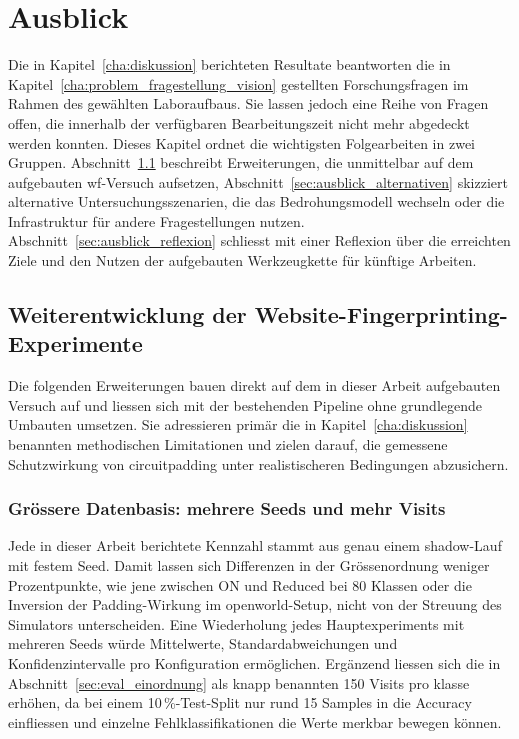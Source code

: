 \chapter{Ausblick}
\label{cha:ausblick}

Die in Kapitel~\ref{cha:diskussion} berichteten Resultate beantworten die in Kapitel~\ref{cha:problem_fragestellung_vision} gestellten Forschungsfragen im Rahmen des gewählten Laboraufbaus.
Sie lassen jedoch eine Reihe von Fragen offen, die innerhalb der verfügbaren Bearbeitungszeit nicht mehr abgedeckt werden konnten.
Dieses Kapitel ordnet die wichtigsten Folgearbeiten in zwei Gruppen.
Abschnitt~\ref{sec:ausblick_wf} beschreibt Erweiterungen, die unmittelbar auf dem aufgebauten \gls{wf}-Versuch aufsetzen, Abschnitt~\ref{sec:ausblick_alternativen} skizziert alternative Untersuchungsszenarien, die das Bedrohungsmodell wechseln oder die Infrastruktur für andere Fragestellungen nutzen.
Abschnitt~\ref{sec:ausblick_reflexion} schliesst mit einer Reflexion über die erreichten Ziele und den Nutzen der aufgebauten Werkzeugkette für künftige Arbeiten.

\section{Weiterentwicklung der Website-Fingerprinting-Experimente}
\label{sec:ausblick_wf}

Die folgenden Erweiterungen bauen direkt auf dem in dieser Arbeit aufgebauten Versuch auf und liessen sich mit der bestehenden Pipeline ohne grundlegende Umbauten umsetzen.
Sie adressieren primär die in Kapitel~\ref{cha:diskussion} benannten methodischen Limitationen und zielen darauf, die gemessene Schutzwirkung von \gls{circuitpadding} unter realistischeren Bedingungen abzusichern.

\subsection{Grössere Datenbasis: mehrere Seeds und mehr Visits}
\label{sec:ausblick_seeds}

Jede in dieser Arbeit berichtete Kennzahl stammt aus genau einem \gls{shadow}-Lauf mit festem Seed.
Damit lassen sich Differenzen in der Grössenordnung weniger Prozentpunkte, wie jene zwischen ON und Reduced bei 80 Klassen oder die Inversion der Padding-Wirkung im \gls{openworld}-Setup, nicht von der Streuung des Simulators unterscheiden.
Eine Wiederholung jedes Hauptexperiments mit mehreren Seeds würde Mittelwerte, Standardabweichungen und Konfidenzintervalle pro Konfiguration ermöglichen.
Ergänzend liessen sich die in Abschnitt~\ref{sec:eval_einordnung} als knapp benannten 150 Visits pro \gls{klasse} erhöhen, da bei einem 10\,\%-Test-Split nur rund 15 Samples in die Accuracy einfliessen und einzelne Fehlklassifikationen die Werte merkbar bewegen können.

